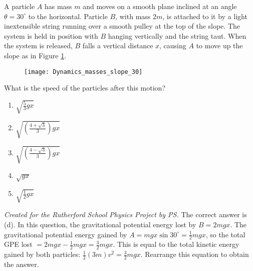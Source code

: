 \begin{problem} 
{A particle $A$ has mass $m$ and moves on a smooth plane inclined at an angle $\theta = 30^{\circ}$ to the horizontal. Particle $B$, with mass $2m$, is attached to it by a light inextensible string running over a smooth pulley at the top of the slope. The system is held in position with $B$ hanging vertically and the string taut. When the system is released, $B$ falls a vertical distance $x$, causing $A$ to move up the slope as in Figure \ref{fig:Dynamics_masses_slope_30}.
\begin{figure}[h]
	\centering
	\texttt{[image: Dynamics\_masses\_slope\_30]}
	\caption{}
	\label{fig:Dynamics_masses_slope_30}
\end{figure}
\nl
What is the speed of the particles after this motion?
\begin{enumerate}
	\item $\sqrt{\frac{5}{3}gx}$
	\item $\sqrt{\left(\frac{4 + \sqrt{3}}{3}\right)gx}$
	\item $\sqrt{\left(\frac{4 - \sqrt{3}}{3}\right)gx}$
	\item $\sqrt{gx}$
	\item $\sqrt{\frac{1}{2}gx}$
\end{enumerate}
}
{\textit{Created for the Rutherford School Physics Project by PS.}}
{The correct answer is (d). In this question, the gravitational potential energy lost by $B = 2mgx$. The gravitational potential energy gained by $A = mgx\sin{30^{\circ}} = \frac{1}{2}mgx$, so the total GPE lost $= 2mgx - \frac{1}{2}mgx = \frac{3}{2}mgx$. This is equal to the total kinetic energy gained by both particles: $\frac{1}{2}\left(3m\right)v^{2} = \frac{3}{2}mgx$. Rearrange this equation to obtain the answer.
}
\end{problem}